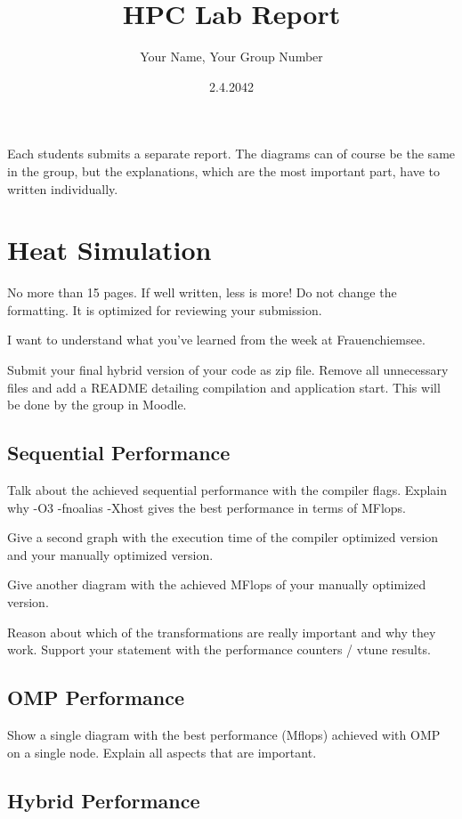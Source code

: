 \documentclass[A4]{article}
\author{Your Name, Your Group Number }
\title{HPC Lab Report}
\date{2.4.2042}
\begin{document}
\maketitle

Each students submits a separate report. The diagrams can of course be the same in the group, but the explanations, which are the most important part, have to written individually.

\section{Heat Simulation}

No more than 15 pages. If well written, less is more! Do not change the formatting. It is optimized for reviewing your submission.

I want to understand what you've learned from the week at Frauenchiemsee.

Submit your final hybrid version of your code as zip file. Remove all unnecessary files and add a README detailing compilation and application start. This will be done by the group in Moodle.

\subsection{Sequential Performance}

Talk about the achieved sequential performance with the compiler flags. Explain why -O3 -fnoalias -Xhost gives the best performance in terms of MFlops. 

Give a second graph with the execution time of the compiler optimized version and your manually optimized version. 

Give another diagram with the achieved MFlops of your manually optimized version.

Reason about which of the transformations are really important and why they work. Support your statement with the performance counters / vtune results.

\subsection{OMP Performance}

Show a single diagram with the best performance (Mflops) achieved with OMP on a single node. Explain all aspects that are important.

\subsection{Hybrid Performance}
\end{document}
